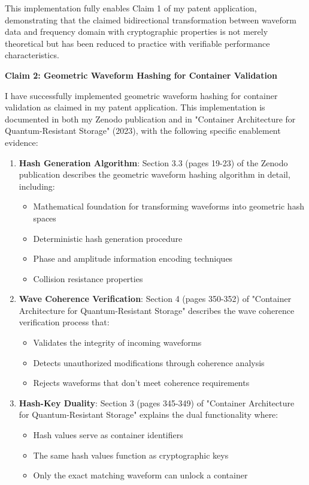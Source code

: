 \documentclass[12pt,letterpaper]{article}
\newcommand{\sectionheading}[1]{\noindent\textbf{#1}\par\vspace{0.25in}}
\begin{document}
\noindent This implementation fully enables Claim 1 of my patent application, demonstrating that the claimed bidirectional transformation between waveform data and frequency domain with cryptographic properties is not merely theoretical but has been reduced to practice with verifiable performance characteristics.

\newpage
\sectionheading{Claim 2: Geometric Waveform Hashing for Container Validation}

\noindent I have successfully implemented geometric waveform hashing for container validation as claimed in my patent application. This implementation is documented in both my Zenodo publication and in "Container Architecture for Quantum-Resistant Storage" (2023), with the following specific enablement evidence:

\begin{enumerate}[label=\arabic*.]
\item \textbf{Hash Generation Algorithm}: Section 3.3 (pages 19-23) of the Zenodo publication describes the geometric waveform hashing algorithm in detail, including:
   \begin{itemize}
   \item Mathematical foundation for transforming waveforms into geometric hash spaces
   \item Deterministic hash generation procedure
   \item Phase and amplitude information encoding techniques
   \item Collision resistance properties
   \end{itemize}

\item \textbf{Wave Coherence Verification}: Section 4 (pages 350-352) of "Container Architecture for Quantum-Resistant Storage" describes the wave coherence verification process that:
   \begin{itemize}
   \item Validates the integrity of incoming waveforms
   \item Detects unauthorized modifications through coherence analysis
   \item Rejects waveforms that don't meet coherence requirements
   \end{itemize}

\item \textbf{Hash-Key Duality}: Section 3 (pages 345-349) of "Container Architecture for Quantum-Resistant Storage" explains the dual functionality where:
   \begin{itemize}
   \item Hash values serve as container identifiers
   \item The same hash values function as cryptographic keys
   \item Only the exact matching waveform can unlock a container
   \end{itemize}


\end{enumerate}
\end{document}
